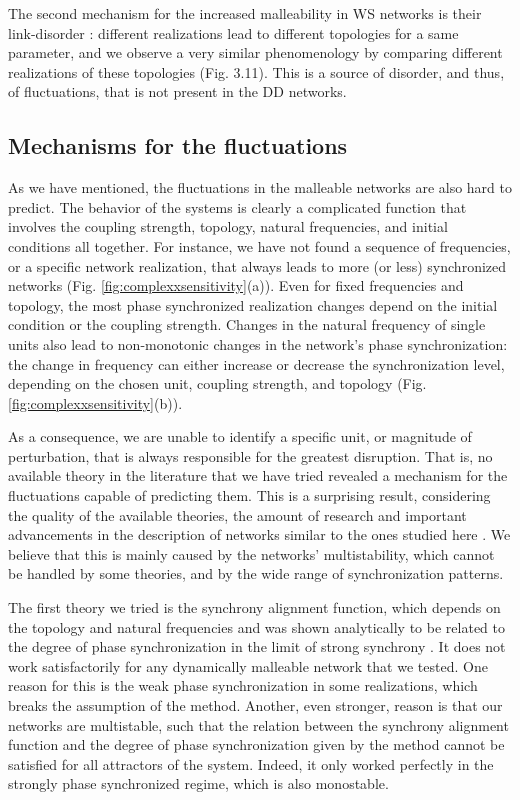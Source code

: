 The second mechanism for the increased malleability in WS networks is their link-disorder \cite{hong2013link}: different realizations lead to different topologies for a same parameter, and we observe a very similar phenomenology by comparing different realizations of these topologies (Fig. 3.11). This is a source of disorder, and thus, of fluctuations, that is not present in the DD networks. 


\subsection*{Mechanisms for the fluctuations}
As we have mentioned, the fluctuations in the malleable networks are also hard to predict. The behavior of the systems is clearly a complicated function that involves the coupling strength, topology, natural frequencies, and initial conditions all together. For instance, we have not found a sequence of frequencies, or a specific network realization, that always leads to more (or less) synchronized networks (Fig. \ref{fig:complexxsensitivity}(a)). Even for fixed frequencies and topology, the most phase synchronized realization changes depend on the initial condition or the coupling strength. Changes in the natural frequency of single units also lead to non-monotonic changes in the network's phase synchronization: the change in frequency can either increase or decrease the synchronization level, depending on the chosen unit, coupling strength, and topology (Fig. \ref{fig:complexxsensitivity}(b)).

As a consequence, we are unable to identify a specific unit, or magnitude of perturbation, that is always responsible for the greatest disruption. That is, no available theory in the literature that we have tried revealed a mechanism for the fluctuations capable of predicting them. This is a surprising result, considering the quality of the available theories, the amount of research and important advancements in the description of networks similar to the ones studied here \cite{peter2018transition, skardal2014optimal, brede2008synchrony, carareto2009optimized}. We believe that this is mainly caused by the networks' multistability, which cannot be handled by some theories, and by the wide range of synchronization patterns. 

The first theory we tried is the synchrony alignment function, which depends on the topology and natural frequencies and was shown analytically to be related to the degree of phase synchronization in the limit of strong synchrony \cite{skardal2014optimal}. It does not work satisfactorily for any dynamically malleable network that we tested. One reason for this is the weak phase synchronization in some realizations, which breaks the assumption of the method. Another, even stronger, reason is that our networks are multistable, such that the relation between the synchrony alignment function and the degree of phase synchronization given by the method cannot be satisfied for all attractors of the system. Indeed, it only worked perfectly in the strongly phase synchronized regime, which is also monostable.

